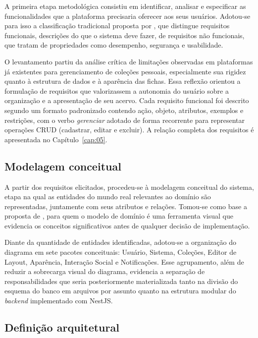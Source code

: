 A primeira etapa metodológica consistiu em identificar, analisar e especificar as funcionalidades que a plataforma precisaria oferecer aos seus usuários. Adotou-se para isso a classificação tradicional proposta por \cite{Sommerville2011}, que distingue requisitos funcionais, descrições do que o sistema deve fazer, de requisitos não funcionais, que tratam de propriedades como desempenho, segurança e usabilidade.

O levantamento partiu da análise crítica de limitações observadas em plataformas já existentes para gerenciamento de coleções pessoais, especialmente sua rigidez quanto à estrutura de dados e à aparência das fichas. Essa reflexão orientou a formulação de requisitos que valorizassem a autonomia do usuário sobre a organização e a apresentação de seu acervo. Cada requisito funcional foi descrito segundo um formato padronizado contendo ação, objeto, atributos, exemplos e restrições, com o verbo \textit{gerenciar} adotado de forma recorrente para representar operações CRUD (cadastrar, editar e excluir). A relação completa dos requisitos é apresentada no Capítulo~\ref{cap:05}.

\subsection{Modelagem conceitual}

A partir dos requisitos elicitados, procedeu-se à modelagem conceitual do sistema, etapa na qual as entidades do mundo real relevantes ao domínio são representadas, juntamente com seus atributos e relações. Tomou-se como base a proposta de \cite{Larman2007}, para quem o modelo de domínio é uma ferramenta visual que evidencia os conceitos significativos antes de qualquer decisão de implementação.

Diante da quantidade de entidades identificadas, adotou-se a organização do diagrama em sete pacotes conceituais: Usuário, Sistema, Coleções, Editor de Layout, Aparência, Interação Social e Notificações. Esse agrupamento, além de reduzir a sobrecarga visual do diagrama, evidencia a separação de responsabilidades que seria posteriormente materializada tanto na divisão do esquema do banco em arquivos por assunto quanto na estrutura modular do \textit{backend} implementado com NestJS.

\subsection{Definição arquitetural}

